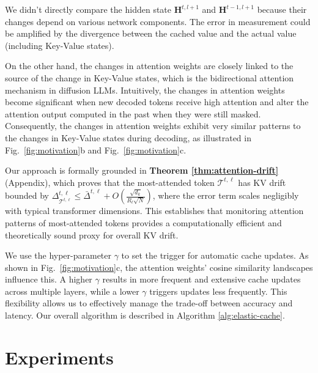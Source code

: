 \documentclass{article} %
\theoremstyle{definition}
\theoremstyle{remark}
\begin{document}
We didn’t directly compare the hidden state $\mathbf{H}^{t,l+1}$ and $\mathbf{H}^{t-1,l+1}$ because their changes depend on various network components. The error in measurement could be amplified by the divergence between the cached value and the actual value (including Key-Value states). 

On the other hand, the changes in attention weights are closely linked to the source of the change in Key-Value states, which is the bidirectional attention mechanism in diffusion LLMs. Intuitively, the changes in attention weights become significant when new decoded tokens receive high attention and alter the attention output computed in the past when they were still masked. Consequently, the changes in attention weights exhibit very similar patterns to the changes in Key-Value states during decoding, as illustrated in Fig.~\ref{fig:motivation}b and Fig.~\ref{fig:motivation}c.

Our approach is formally grounded in \textbf{Theorem \ref{thm:attention-drift}} (Appendix), which proves that the most-attended token $\mathcal{T}^{t,\ell}$ has KV drift bounded by $\Delta^{t,\ell}_{\mathcal{T}^{t,\ell}} \leq \bar{\Delta}^{t,\ell} + O\left(\frac{\sqrt{d_k}}{R_\ell\sqrt{N}}\right)$, where the error term scales negligibly with typical transformer dimensions. This establishes that monitoring attention patterns of most-attended tokens provides a computationally efficient and theoretically sound proxy for overall KV drift.

We use the hyper-parameter $\gamma$ to set the trigger for automatic cache updates. As shown in Fig.~\ref{fig:motivation}c, the attention weights' cosine similarity landscapes influence this. A higher $\gamma$ results in more frequent and extensive cache updates across multiple layers, while a lower $\gamma$ triggers updates less frequently. This flexibility allows us to effectively manage the trade-off between accuracy and latency. Our overall algorithm is described in Algorithm \ref{alg:elastic-cache}.

\vspace{-0.15in}
\section{Experiments}
\vspace{-0.1in}
\end{document}
